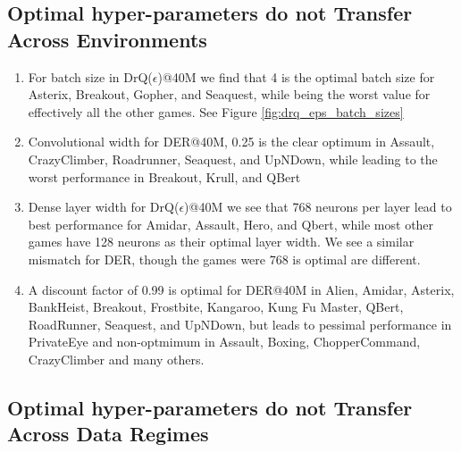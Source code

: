 \documentclass[10pt]{article} %
\begin{document}
\subsection{Optimal hyper-parameters do not Transfer Across Environments}
\begin{enumerate}
    \item For batch size in DrQ($\epsilon$)@40M we find that 4 is the optimal batch size for Asterix, Breakout, Gopher, and Seaquest, while being the worst value for effectively all the other games. See Figure \ref{fig:drq_eps_batch_sizes}
    \item Convolutional width for DER@40M, 0.25 is the clear optimum in Assault, CrazyClimber, Roadrunner, Seaquest, and UpNDown, while leading to the worst performance in Breakout, Krull, and QBert
    \item Dense layer width for DrQ($\epsilon$)@40M we see that 768 neurons per layer lead to best performance for Amidar, Assault, Hero, and Qbert, while most other games have 128 neurons as their optimal layer width. We see a similar mismatch for DER, though the games were 768 is optimal are different.
    \item A discount factor of 0.99 is optimal for DER@40M in Alien, Amidar, Asterix, BankHeist, Breakout, Frostbite, Kangaroo, Kung Fu Master, QBert, RoadRunner, Seaquest, and UpNDown, but leads to pessimal performance in PrivateEye and non-optmimum in Assault, Boxing, ChopperCommand, CrazyClimber and many others.
\end{enumerate}

\subsection{Optimal hyper-parameters do not Transfer Across Data Regimes}
\end{document}
